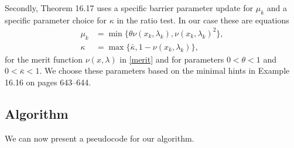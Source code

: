 \documentclass[11pt]{article}
\begin{document}
Secondly, Theorem 16.17 uses a specific barrier parameter update for $\mu_k$ and a specific parameter choice for $\kappa$ in the ratio test.  In our case these are equations
\begin{align*}
\mu_k &= \min\{\theta \nu(x_k,\lambda_k),\nu(x_k,\lambda_k)^2\}, \\
\kappa &= \max\{\bar\kappa,1-\nu(x_k,\lambda_k)\},
\end{align*}
for the merit function $\nu(x,\lambda)$ in \eqref{merit} and for parameters $0<\theta<1$ and $0<\bar\kappa<1$.  We choose these parameters based on the minimal hints in Example 16.16 on pages 643--644.


\subsection*{Algorithm}

We can now present a pseudocode for our algorithm.
\end{document}
